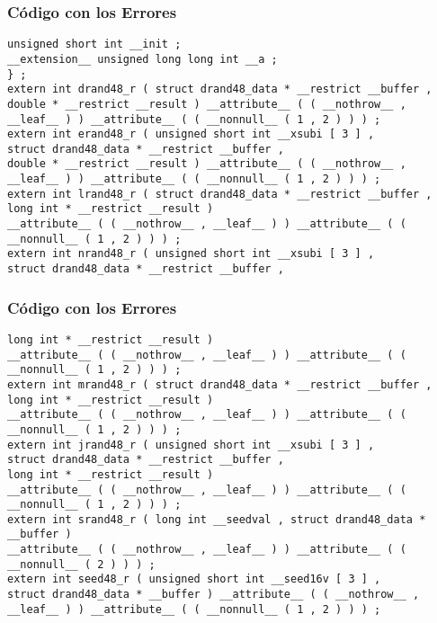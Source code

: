 \documentclass{beamer}
\begin{document}
\begin{frame}[fragile]
\frametitle{C\'odigo con los Errores}
\begin{lstlisting}[style=CStyle]
unsigned short int __init ; 
__extension__ unsigned long long int __a ; 
} ; 
extern int drand48_r ( struct drand48_data * __restrict __buffer , 
double * __restrict __result ) __attribute__ ( ( __nothrow__ , __leaf__ ) ) __attribute__ ( ( __nonnull__ ( 1 , 2 ) ) ) ; 
extern int erand48_r ( unsigned short int __xsubi [ 3 ] , 
struct drand48_data * __restrict __buffer , 
double * __restrict __result ) __attribute__ ( ( __nothrow__ , __leaf__ ) ) __attribute__ ( ( __nonnull__ ( 1 , 2 ) ) ) ; 
extern int lrand48_r ( struct drand48_data * __restrict __buffer , 
long int * __restrict __result ) 
__attribute__ ( ( __nothrow__ , __leaf__ ) ) __attribute__ ( ( __nonnull__ ( 1 , 2 ) ) ) ; 
extern int nrand48_r ( unsigned short int __xsubi [ 3 ] , 
struct drand48_data * __restrict __buffer , 
\end{lstlisting}
\end{frame}
\begin{frame}[fragile]
\frametitle{C\'odigo con los Errores}
\begin{lstlisting}[style=CStyle]
long int * __restrict __result ) 
__attribute__ ( ( __nothrow__ , __leaf__ ) ) __attribute__ ( ( __nonnull__ ( 1 , 2 ) ) ) ; 
extern int mrand48_r ( struct drand48_data * __restrict __buffer , 
long int * __restrict __result ) 
__attribute__ ( ( __nothrow__ , __leaf__ ) ) __attribute__ ( ( __nonnull__ ( 1 , 2 ) ) ) ; 
extern int jrand48_r ( unsigned short int __xsubi [ 3 ] , 
struct drand48_data * __restrict __buffer , 
long int * __restrict __result ) 
__attribute__ ( ( __nothrow__ , __leaf__ ) ) __attribute__ ( ( __nonnull__ ( 1 , 2 ) ) ) ; 
extern int srand48_r ( long int __seedval , struct drand48_data * __buffer ) 
__attribute__ ( ( __nothrow__ , __leaf__ ) ) __attribute__ ( ( __nonnull__ ( 2 ) ) ) ; 
extern int seed48_r ( unsigned short int __seed16v [ 3 ] , 
struct drand48_data * __buffer ) __attribute__ ( ( __nothrow__ , __leaf__ ) ) __attribute__ ( ( __nonnull__ ( 1 , 2 ) ) ) ; 
\end{lstlisting}
\end{frame}
\end{document}
